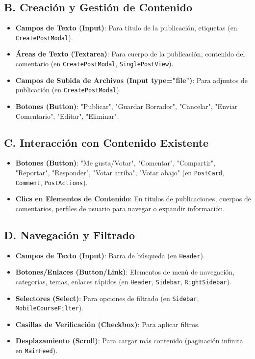 \documentclass{article}
\begin{document}
	\subsection*{B. Creación y Gestión de Contenido}
	\begin{itemize}
		\item \textbf{Campos de Texto (Input)}: Para título de la publicación,
			etiquetas (en \texttt{CreatePostModal}).

		\item \textbf{Áreas de Texto (Textarea)}: Para cuerpo de la publicación,
			contenido del comentario (en \texttt{CreatePostModal}, \texttt{SinglePostView}).

		\item \textbf{Campos de Subida de Archivos (Input type="file")}: Para adjuntos
			de publicación (en \texttt{CreatePostModal}).

		\item \textbf{Botones (Button)}: "Publicar", "Guardar Borrador", "Cancelar",
			"Enviar Comentario", "Editar", "Eliminar".
	\end{itemize}

	\subsection*{C. Interacción con Contenido Existente}
	\begin{itemize}
		\item \textbf{Botones (Button)}: "Me gusta/Votar", "Comentar", "Compartir",
			"Reportar", "Responder", "Votar arriba", "Votar abajo" (en \texttt{PostCard},
			\texttt{Comment}, \texttt{PostActions}).

		\item \textbf{Clics en Elementos de Contenido}: En títulos de publicaciones,
			cuerpos de comentarios, perfiles de usuario para navegar o expandir información.
	\end{itemize}

	\subsection*{D. Navegación y Filtrado}
	\begin{itemize}
		\item \textbf{Campos de Texto (Input)}: Barra de búsqueda (en \texttt{Header}).

		\item \textbf{Botones/Enlaces (Button/Link)}: Elementos de menú de navegación,
			categorías, temas, enlaces rápidos (en \texttt{Header}, \texttt{Sidebar}, \texttt{RightSidebar}).

		\item \textbf{Selectores (Select)}: Para opciones de filtrado (en \texttt{Sidebar},
			\texttt{MobileCourseFilter}).

		\item \textbf{Casillas de Verificación (Checkbox)}: Para aplicar filtros.

		\item \textbf{Desplazamiento (Scroll)}: Para cargar más contenido (paginación
			infinita en \texttt{MainFeed}).
	\end{itemize}
\end{document}
